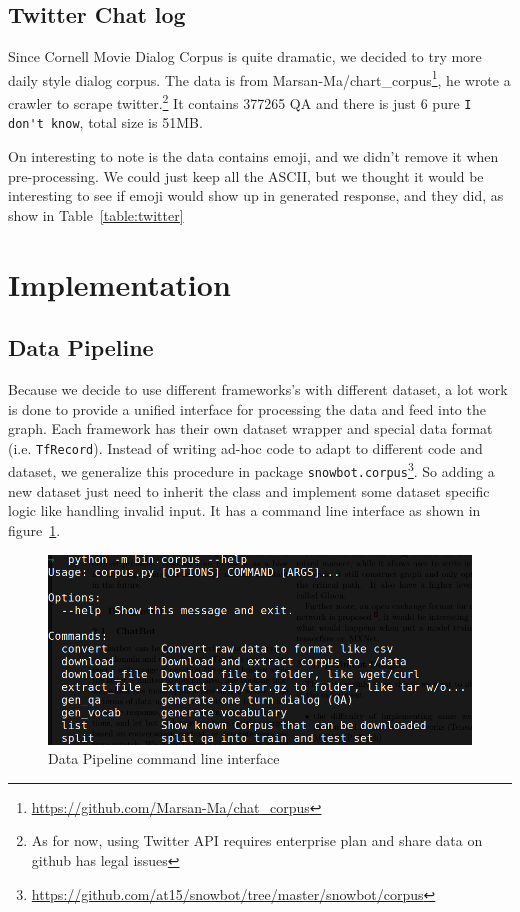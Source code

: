 \documentclass{article}
\begin{document}
\subsection{Twitter Chat log}
\label{subsec:twitter}

Since Cornell Movie Dialog Corpus is quite dramatic, we decided to try more daily style dialog corpus.
The data is from Marsan-Ma/chart\_corpus\footnote{\url{https://github.com/Marsan-Ma/chat\_corpus}}, he wrote
a crawler to scrape twitter.\footnote{As for now, using Twitter API requires enterprise plan and share data on github has legal issues}
It contains 377265 QA and there is just 6 pure \verb+I don't know+, total size is 51MB.

On interesting to note is the data contains emoji, and we didn't remove it when pre-processing.
We could just keep all the ASCII, but we thought it would be interesting to see if emoji would show up in generated response, and they did, as show in Table~\ref{table:twitter}


\section{Implementation}
\label{sec:implementation}

\subsection{Data Pipeline}
\label{subsec:data-pipeline}

Because we decide to use different frameworks's with different dataset, a lot work is done to provide a unified interface
for processing the data and feed into the graph.
Each framework has their own dataset wrapper and special data format (i.e. \verb+TfRecord+).
Instead of writing ad-hoc code to adapt to different code and dataset,
we generalize this procedure in package \verb+snowbot.corpus+\footnote{\url{https://github.com/at15/snowbot/tree/master/snowbot/corpus}}.
So adding a new dataset just need to inherit the class and implement some dataset specific logic like handling invalid input.
It has a command line interface as shown in figure~\ref{fig:data-pipeline}.

\begin{figure}[h]
    \centering
    \includegraphics[width=\columnwidth]{data-pipeline}
    \caption{Data Pipeline command line interface}
    \label{fig:data-pipeline}
\end{figure}
\end{document}
